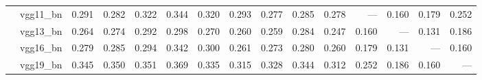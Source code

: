 \begin{table}
\begin{tabular}{llrrrrrrrrrrrrr}
       & vgg11_bn &                 0.291 &                 0.282 &                 0.322 &               0.344 &                   0.320 &                   0.293 &              0.277 &              0.285 &              0.278 &                 --- &               0.160 &               0.179 &               0.252 \\
       & vgg13_bn &                 0.264 &                 0.274 &                 0.292 &               0.298 &                   0.270 &                   0.260 &              0.259 &              0.284 &              0.247 &               0.160 &                 --- &               0.131 &               0.186 \\
       & vgg16_bn &                 0.279 &                 0.285 &                 0.294 &               0.342 &                   0.300 &                   0.261 &              0.273 &              0.280 &              0.260 &               0.179 &               0.131 &                 --- &               0.160 \\
       & vgg19_bn &                 0.345 &                 0.350 &                 0.351 &               0.369 &                   0.335 &                   0.315 &              0.328 &              0.344 &              0.312 &               0.252 &               0.186 &               0.160 &                 --- \\
\bottomrule
\end{tabular}
\end{table}
